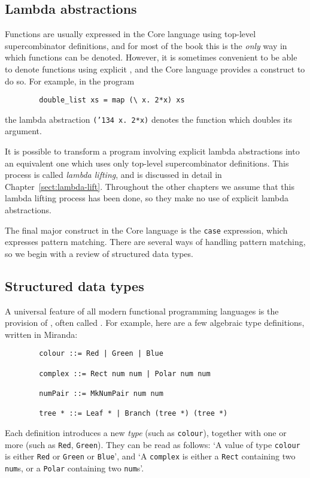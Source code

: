 \subsection{Lambda abstractions}

Functions are usually expressed in the Core language using top-level
supercombinator definitions, and for most of the book this is the {\em only\/}
way in which functions can be denoted.
However, it is sometimes convenient to be able to denote functions
using explicit ,
and the Core language provides a construct
to do so.
For example, in the program
\begin{verbatim}
        double_list xs = map (\ x. 2*x) xs
\end{verbatim}
the lambda abstraction \mbox{\tt ({\char'134}\ x.\ 2*x)} denotes the function which doubles its
argument.

It is possible to transform a program involving explicit lambda
abstractions into an equivalent one which uses only top-level supercombinator
definitions.  This process is called {\em lambda lifting},
and is
discussed in detail in Chapter~\ref{sect:lambda-lift}.  Throughout the other
chapters we assume that this lambda lifting process has been done, so
they make no use of explicit lambda abstractions.

The final major construct in the Core language is the \mbox{\tt case} expression, which
expresses pattern matching.  There are several ways of handling pattern
matching, so we begin with a review of structured data types.

\subsection{Structured data types}
\label{sect:structured-types}

A universal feature of all modern functional programming languages is
the provision of , often called
.
For example, here are a few algebraic type definitions, written
in Miranda:
\begin{verbatim}
        colour ::= Red | Green | Blue

        complex ::= Rect num num | Polar num num

        numPair ::= MkNumPair num num

        tree * ::= Leaf * | Branch (tree *) (tree *)
\end{verbatim}
Each definition introduces a new {\em type\/} (such as \mbox{\tt colour}), together
with one or more  (such as \mbox{\tt Red}, \mbox{\tt Green}).  They
can be read as follows: `A value of type \mbox{\tt colour} is either \mbox{\tt Red} or \mbox{\tt Green}
or \mbox{\tt Blue}', and `A \mbox{\tt complex} is either a \mbox{\tt Rect} containing two \mbox{\tt num}s, or
a \mbox{\tt Polar} containing two \mbox{\tt num}s'.

